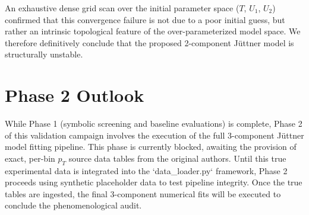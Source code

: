 An exhaustive dense grid scan over the initial parameter space ($T$, $U_1$, $U_2$) confirmed that this convergence failure is not due to a poor initial guess, but rather an intrinsic topological feature of the over-parameterized model space. We therefore definitively conclude that the proposed 2-component J\"uttner model is structurally unstable.

\section{Phase 2 Outlook}
While Phase 1 (symbolic screening and baseline evaluations) is complete, Phase 2 of this validation campaign involves the execution of the full 3-component J\"uttner model fitting pipeline. This phase is currently blocked, awaiting the provision of exact, per-bin $p_T$ source data tables from the original authors. Until this true experimental data is integrated into the `data_loader.py` framework, Phase 2 proceeds using synthetic placeholder data to test pipeline integrity. Once the true tables are ingested, the final 3-component numerical fits will be executed to conclude the phenomenological audit.
